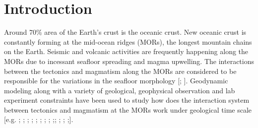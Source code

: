 \pagebreak
\section{Introduction}
\label{ch:Intro}  %

Around 70\% area of the Earth's crust is the oceanic crust. New oceanic crust is constantly forming at the mid-ocean ridges (MORs), the longest mountain chains on the Earth. Seismic and volcanic activities are frequently happening along the MORs due to incessant seafloor spreading and magma upwelling. The interactions between the tectonics and magmatism along the MORs are considered to be responsible for the variations in the seafloor morphology [\citealp{Buck2005}; \citealp{Tucholke2008}].
%
%
Geodynamic modeling along with a variety of geological, geophysical observation and lab experiment constraints have been used to study how does the interaction system between tectonics and magmatism at the MORs work under geological time scale [e.g. \citealp{Tucholke1994}; \citealp{Blackman2004}; \citealp{Behn2006}; \citealp{Behn2008}; \citealp{Ito2008};  \citealp{Baines2008}; \citealp{Escartin2008}; \citealp{Canales2008}; \citealp{Dick2008};\citealp{Dannowski2010}; \citealp{Olive2010}; \citealp{Reston2011a}; \citealp{Reston2011b};].

